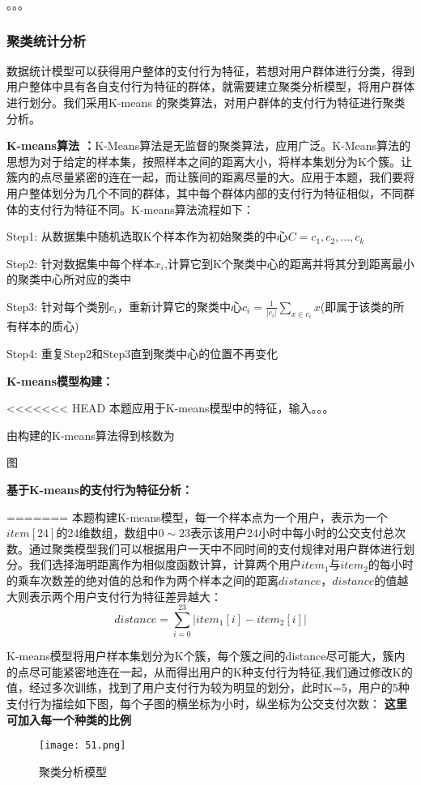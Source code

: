 \documentclass[withoutpreface,bwprint]{cumcmthesis} %
\begin{document}
。。。
\subsubsection{聚类统计分析}
数据统计模型可以获得用户整体的支付行为特征，若想对用户群体进行分类，得到用户整体中具有各自支付行为特征的群体，就需要建立聚类分析模型，将用户群体进行划分。我们采用K-means 的聚类算法，对用户群体的支付行为特征进行聚类分析。

\textbf{K-means算法 ：}K-Means算法是无监督的聚类算法，应用广泛。K-Means算法的思想为对于给定的样本集，按照样本之间的距离大小，将样本集划分为K个簇。让簇内的点尽量紧密的连在一起，而让簇间的距离尽量的大。应用于本题，我们要将用户整体划分为几个不同的群体，其中每个群体内部的支付行为特征相似，不同群体的支付行为特征不同。K-means算法流程如下：

Step1: 从数据集中随机选取K个样本作为初始聚类的中心$C={c_1,c_2,...,c_k}$

Step2: 针对数据集中每个样本$x_i$,计算它到K个聚类中心的距离并将其分到距离最小的聚类中心所对应的类中

Step3: 针对每个类别$c_i$，重新计算它的聚类中心$c_i=\frac{1}{\left|c_i\right|}\sum_{x \in c_i}x$(即属于该类的所有样本的质心)

Step4: 重复Step2和Step3直到聚类中心的位置不再变化

\textbf{K-means模型构建：}

<<<<<<< HEAD
本题应用于K-means模型中的特征，输入。。。

由构建的K-means算法得到核数为

图

\textbf{基于K-means的支付行为特征分析：}


=======
本题构建K-means模型，每一个样本点为一个用户，表示为一个$item[24]$的24维数组，数组中$0\sim23$表示该用户24小时中每小时的公交支付总次数。通过聚类模型我们可以根据用户一天中不同时间的支付规律对用户群体进行划分。我们选择海明距离作为相似度函数计算，计算两个用户$item_1$与$item_2$的每小时的乘车次数差的绝对值的总和作为两个样本之间的距离$distance$，$distance$的值越大则表示两个用户支付行为特征差异越大：
\begin{equation}
distance=\sum_{i=0}^{23}|item_1[i]-item_2[i]|
\end{equation}

K-means模型将用户样本集划分为K个簇，每个簇之间的distance尽可能大，簇内的点尽可能紧密地连在一起，从而得出用户的K种支付行为特征,我们通过修改K的值，经过多次训练，找到了用户支付行为较为明显的划分，此时K=5，用户的5种支付行为描绘如下图，每个子图的横坐标为小时，纵坐标为公交支付次数：
\textbf{这里可加入每一个种类的比例}
\begin{figure}[h]
\centering
\texttt{[image: 51.png]}
\caption{聚类分析模型}
\end{figure}
\end{document}
